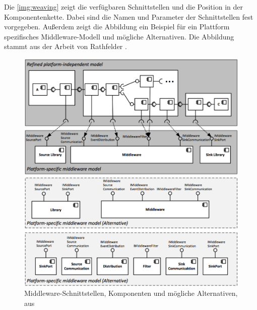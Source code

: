 Die \autoref{img:weaving} zeigt die verfügbaren Schnittstellen und die Position in der Komponentenkette. Dabei sind die Namen und Parameter der Schnittstellen fest vorgegeben. Außerdem zeigt die Abbildung ein Beispiel für ein Plattform spezifisches Middleware-Modell und mögliche Alternativen. Die Abbildung stammt aus der Arbeit von Rathfelder \cite{Rathfelder2013}.

\begin{figure}
\center
  \includegraphics[width=1\textwidth]{images/grundlagen/middleware-model-weaving.png}
  \caption{Middleware-Schnittstellen, Komponenten und mögliche Alternativen, aus \cite{Rathfelder2013}}
  \label{img:weaving}
\end{figure}


